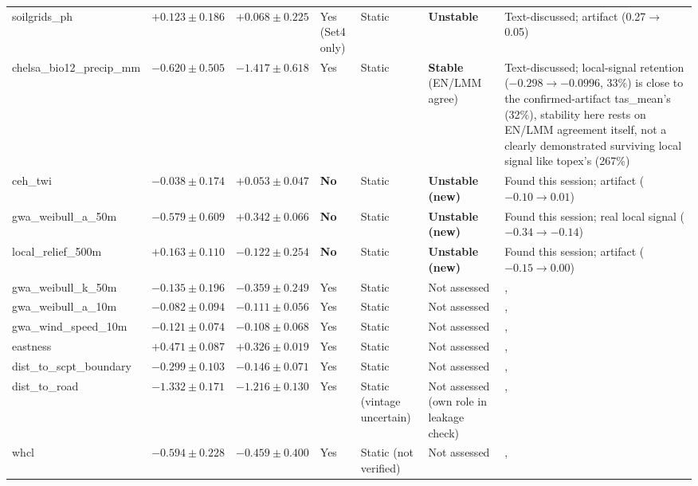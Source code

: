 {\begin{longtable}{p{2.6cm}p{1.5cm}p{1.5cm}p{1.3cm}p{1.7cm}p{1.6cm}p{2.6cm}}
soilgrids\_ph & $+0.123\pm0.186$ & $+0.068\pm0.225$ & Yes (Set4 only) & Static & \textbf{Unstable} & Text-discussed; artifact (0.27$\to$0.05) \\
chelsa\_bio12\_precip\_mm & $-0.620\pm0.505$ & $-1.417\pm0.618$ & Yes & Static & \textbf{Stable} (EN/LMM agree) & Text-discussed; local-signal retention ($-0.298\to-0.0996$, 33\%) is close to the confirmed-artifact tas\_mean's (32\%), stability here rests on EN/LMM agreement itself, not a clearly demonstrated surviving local signal like topex's (267\%) \\
ceh\_twi & $-0.038\pm0.174$ & $+0.053\pm0.047$ & \textbf{No} & Static & \textbf{Unstable (new)} & Found this session; artifact ($-0.10\to0.01$) \\
gwa\_weibull\_a\_50m & $-0.579\pm0.609$ & $+0.342\pm0.066$ & \textbf{No} & Static & \textbf{Unstable (new)} & Found this session; real local signal ($-0.34\to-0.14$) \\
local\_relief\_500m & $+0.163\pm0.110$ & $-0.122\pm0.254$ & \textbf{No} & Static & \textbf{Unstable (new)} & Found this session; artifact ($-0.15\to0.00$) \\
gwa\_weibull\_k\_50m & $-0.135\pm0.196$ & $-0.359\pm0.249$ & Yes & Static & Not assessed &, \\
gwa\_weibull\_a\_10m & $-0.082\pm0.094$ & $-0.111\pm0.056$ & Yes & Static & Not assessed &, \\
gwa\_wind\_speed\_10m & $-0.121\pm0.074$ & $-0.108\pm0.068$ & Yes & Static & Not assessed &, \\
eastness & $+0.471\pm0.087$ & $+0.326\pm0.019$ & Yes & Static & Not assessed &, \\
dist\_to\_scpt\_boundary & $-0.299\pm0.103$ & $-0.146\pm0.071$ & Yes & Static & Not assessed &, \\
dist\_to\_road & $-1.332\pm0.171$ & $-1.216\pm0.130$ & Yes & Static (vintage uncertain) & Not assessed (own role in leakage check) &, \\
whcl & $-0.594\pm0.228$ & $-0.459\pm0.400$ & Yes & Static (not verified) & Not assessed &, \\
\end{longtable}
}

